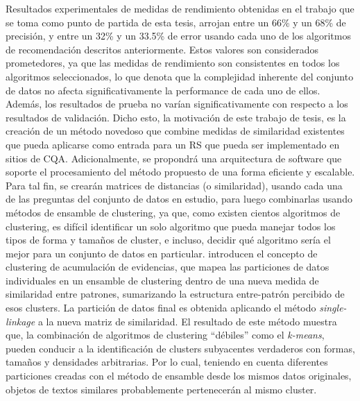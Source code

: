 \bigskip Resultados experimentales de medidas de rendimiento obtenidas en el trabajo que se toma como punto de partida de esta tesis, arrojan entre un 66\% y un 68\% de precisión, y entre un 32\% y un 33.5\% de error usando cada uno de los algoritmos de recomendación descritos anteriormente. Estos valores son considerados prometedores, ya que las medidas de rendimiento son consistentes en todos los algoritmos seleccionados, lo que denota que la complejidad inherente del conjunto de datos no afecta significativamente la performance de cada uno de ellos. Además, los resultados de prueba no varían significativamente con respecto a los resultados de validación. Dicho esto, la motivación de este trabajo de tesis, es la creación de un método novedoso que combine medidas de similaridad existentes que pueda aplicarse como entrada para un RS que pueda ser implementado en sitios de CQA. Adicionalmente, se propondrá una arquitectura de software que soporte el procesamiento del método propuesto de una forma eficiente y escalable. Para tal fin, se crearán matrices de distancias (o similaridad), usando cada una de las preguntas del conjunto de datos en estudio, para luego combinarlas usando métodos de ensamble de clustering, ya que, como existen cientos algoritmos de clustering, es difícil identificar un solo algoritmo que pueda manejar todos los tipos de forma y tamaños de cluster, e incluso, decidir qué algoritmo sería el mejor para un conjunto de datos en particular. \cite{fred2005combining} introducen el concepto de clustering de acumulación de evidencias, que mapea las particiones de datos individuales en un ensamble de clustering dentro de una nueva medida de similaridad entre patrones, sumarizando la estructura entre-patrón percibido de esos clusters. La partición de datos final es obtenida aplicando el método \textit{single-linkage} a la nueva matriz de similaridad. El resultado de este método muestra que, la combinación de algoritmos de clustering “débiles” como el \textit{k-means}, pueden conducir a la identificación de clusters subyacentes verdaderos con formas, tamaños y densidades arbitrarias. Por lo cual, teniendo en cuenta diferentes particiones creadas con el método de ensamble desde los mismos datos originales, objetos de textos similares probablemente pertenecerán al mismo cluster.

